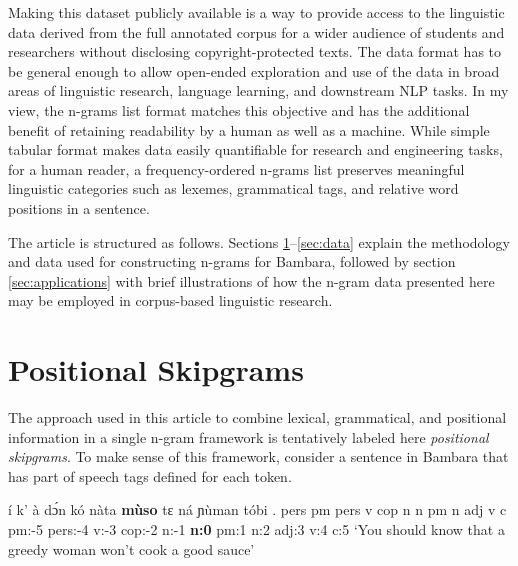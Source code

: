 \documentclass[12pt]{article}
\begin{document}
Making this dataset publicly available is a way to provide access to
the linguistic data derived from the full annotated corpus for a wider
audience of students and researchers without disclosing
copyright-protected texts. The data format has to be general enough to
allow open-ended exploration and use of the data in broad areas of
linguistic research, language learning, and downstream NLP tasks. In
my view, the n-grams list format matches this objective
and has the additional benefit of retaining readability by a human as
well as a machine. While simple tabular format makes data easily
quantifiable for research and engineering tasks, for a human reader, a
frequency-ordered n-grams list preserves meaningful linguistic
categories such as lexemes, grammatical tags, and relative word positions in
a sentence. %


The article is structured as follows. Sections
\ref{sec:definition}--\ref{sec:data} explain the methodology and data
used for constructing n-grams for Bambara, followed by section
\ref{sec:applications} with brief illustrations of how the n-gram data
presented here may be employed in corpus-based linguistic research.

\section{Positional Skipgrams}
\label{sec:definition}

The approach used in this article to combine lexical, grammatical, and
positional information in a single n-gram framework is tentatively
labeled here \textit{positional skipgrams}.  To make sense of this
framework, consider a sentence in Bambara that has part of speech tags
defined for each token.

\begin{example}
  \label{ex:muso}
  \trigloss
  {í       k'      à       dɔ́n     kó      nàta    \textbf{mùso}    tɛ      ná      ɲùman   tóbi    .}
  {pers    pm      pers    v       cop     n       n       pm      n       adj     v       c}
  {{} pm:-5 pers:-4 v:-3 cop:-2 n:-1 \textbf{n:0} pm:1 n:2 adj:3 v:4 c:5}
  {‘You should know that a greedy woman won't cook a good sauce’}
\end{example}
\end{document}
